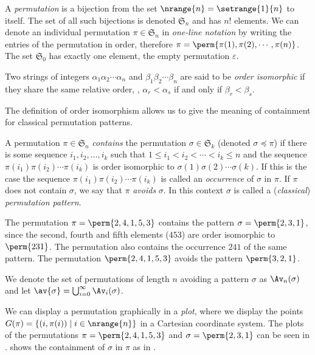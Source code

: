 A \emph{permutation} is a bijection from the set \(\nrange{n} =
\setrange{1}{n}\) to itself. The set of all such bijections is denoted
\(\mathfrak{S}_n\) and has \(n!\) elements. We can denote an individual
permutation \(\pi\in\mathfrak{S}_n\) in \emph{one-line notation} by writing the
entries of the permutation in order, therefore \(\pi =
\perm{\pi(1),\pi(2),\dotsm,\pi(n)}\). The set \(\mathfrak{S}_0\) has exactly one
element, the empty permutation \(\varepsilon\).

\begin{definition}
    Two strings of integers \(\alpha_1\alpha_2\dotsm\alpha_n\) and
    \(\beta_1\beta_2\dotsm\beta_n\) are said to be \emph{order isomorphic}
    if they share the same relative order, \ie, \(\alpha_r<\alpha_s\) if and
    only if \(\beta_r<\beta_s\).
\end{definition}

The definition of order isomorphism allows us to give the meaning of containment for classical
permutation patterns.
\begin{definition}
    A permutation \(\pi\in\mathfrak{S}_n\) \emph{contains} the permutation
    \(\sigma\in\mathfrak{S}_k\) (\mbox{denoted} \(\sigma \preceq \pi\)) if there
    is some sequence \( i_1,i_2,\dotsc,i_k\) such that \(1\le
    i_1<i_2<\dotsm<i_k\le n\) and the sequence
    \(\pi(i_1)\pi(i_2)\dotsm\pi(i_k)\) is order isomorphic to
    \(\sigma(1)\sigma(2)\dotsm\sigma(k)\). If this is the case the sequence
    \(\pi(i_1)\pi(i_2)\dotsm\pi(i_k)\) is called an \emph{occurrence} of
    \(\sigma\) in \(\pi\). If \(\pi\) does not contain \(\sigma\), we say that
    \(\pi\) \emph{avoids} \(\sigma\). In this context \(\sigma\) is called a
    (\emph{classical}) \emph{permutation pattern}.
\end{definition}

\begin{example}
\label{ex:contexmpl}
The permutation \(\pi = \perm{2,4,1,5,3}\) contains the pattern \(\sigma =
\perm{2,3,1}\), since the second, fourth and fifth elements (\(453\)) are order
isomorphic to \(\perm{231}\). The permutation also contains the occurrence
\(241\) of the same pattern. The permutation \(\perm{2,4,1,5,3}\) avoids the
pattern \(\perm{3,2,1}\).
\end{example}

We denote the set of permutations of length \(n\) avoiding a pattern \(\sigma\)
as \(\Av_n(\sigma)\) and let
\(\av{\sigma}=\bigcup_{i=0}^{\infty}\Av_i(\sigma)\).

We can display a permutation graphically in a \emph{plot}, where we display the
points \(G(\pi) = \{(i,\pi(i))\mid i \in \nrange{n} \}\) in a Cartesian
coordinate system. The plots of the permutations \(\pi = \perm{2,4,1,5,3}\) and
\(\sigma = \perm{2,3,1}\) can be seen in .
 shows the containment of \(\sigma\) in \(\pi\) as in
.

